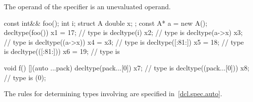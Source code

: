 The operand of the  specifier is an unevaluated
operand.

\begin{example}
\begin{codeblock}
const int&& foo();
int i;
struct A { double x; };
const A* a = new A();
decltype(foo()) x1 = 17;        // type is 
decltype(i) x2;                 // type is 
decltype(a->x) x3;              // type is 
decltype((a->x)) x4 = x3;       // type is 
decltype([:^^x1:]) x5 = 18;     // type is 
decltype(([:^^x1:])) x6 = 19;   // type is 

void f() {
  [](auto ...pack) {
    decltype(pack...[0]) x7;    // type is 
    decltype((pack...[0])) x8;  // type is 
  }(0);
}
\end{codeblock}
\end{example}
\begin{note}
The rules for determining types involving  are specified
in~\ref{dcl.spec.auto}.
\end{note}

